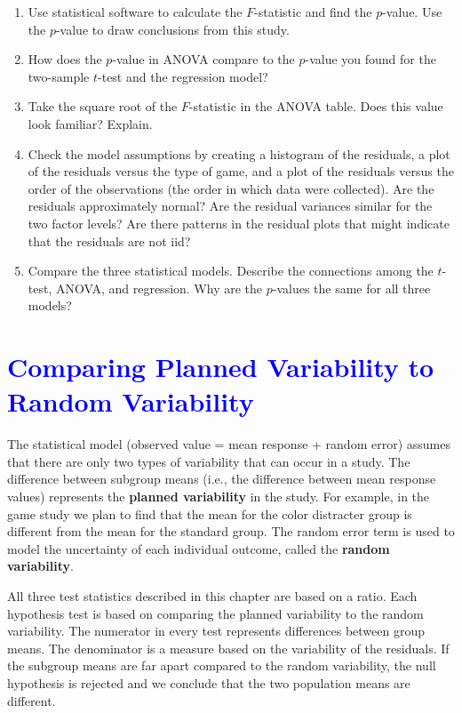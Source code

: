 \documentclass[
]{report}
\begin{document}
\begin{enumerate}
\def\labelenumi{\arabic{enumi}.}
\setcounter{enumi}{22}
\item
  Use statistical software to calculate the \(\scriptstyle F\)-statistic and find the \(\scriptstyle p\)-value. Use the \(\scriptstyle p\)-value to draw conclusions from this study.
\item
  How does the \(\scriptstyle p\)-value in ANOVA compare to the \(\scriptstyle p\)-value you found for the two-sample \(\scriptstyle t\)-test and the regression model?
\item
  Take the square root of the \(\scriptstyle F\)-statistic in the ANOVA table. Does this value look familiar? Explain.
\item
  Check the model assumptions by creating a histogram of the residuals, a plot of the residuals versus the type of game, and a plot of the residuals versus the order of the observations (the order in which data were collected). Are the residuals approximately normal? Are the residual variances similar for the two factor levels? Are there patterns in the residual plots that might indicate that the residuals are not iid?
\item
  Compare the three statistical models. Describe the connections among the \(\scriptstyle t\)-test, ANOVA, and regression. Why are the \(\scriptstyle p\)-values the same for all three models?
\end{enumerate}

\hypertarget{section-18}{%
\section{\texorpdfstring{\textcolor{blue}{ Comparing Planned Variability to Random Variability}}{}}\label{section-18}}

The statistical model (observed value = mean response + random error) assumes that there are only two types of variability that can occur in a study. The difference between subgroup means (i.e., the difference between mean response values) represents the \textbf{planned variability} in the study. For example, in the game study we plan to find that the mean for the color distracter group is different from the mean for the standard group. The random error term is used to model the uncertainty of each individual outcome, called the \textbf{random variability}.

All three test statistics described in this chapter are based on a ratio. Each hypothesis test is based on comparing the planned variability to the random variability. The numerator in every test represents differences between group means. The denominator is a measure based on the variability of the residuals. If the subgroup means are far apart compared to the random variability, the null hypothesis is rejected and we conclude that the two population means are different.
\end{document}
